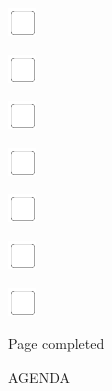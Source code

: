 \documentclass[11pt,titlepage]{article}
\begin{document}
\vspace{10mm}

\noindent
\includegraphics[]{checkbox-4mm.pdf}

\vspace{10mm}

\noindent
\includegraphics[]{checkbox-4mm.pdf}

\vspace{10mm}

\noindent
\includegraphics[]{checkbox-4mm.pdf}

\vspace{10mm}

\noindent
\includegraphics[]{checkbox-4mm.pdf}

\vspace{10mm}

\noindent
\includegraphics[]{checkbox-4mm.pdf}

\vspace{10mm}

\noindent
\includegraphics[]{checkbox-4mm.pdf}

\vspace{10mm}

\noindent
\includegraphics[]{checkbox-4mm.pdf}

\vspace{4mm}

\hfill Page completed \hspace{20mm}

\pagebreak

\small %
\hfill AGENDA
\end{document}
